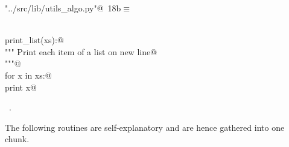 \documentclass[11.5pt]{report}
\begin{document}
\begin{flushleft} \small\label{scrap11}\raggedright\small
{} \verb@"../src/lib/utils_algo.py"@\nobreak\ {\footnotesize {18b}}$\equiv$
\vspace{-1ex}
\begin{list}{}{} \item
\mbox{}\verb@@\\
\mbox{}\verb@def print_list(xs):@\\
\mbox{}\verb@    """ Print each item of a list on new line@\\
\mbox{}\verb@    """@\\
\mbox{}\verb@    for x in xs:@\\
\mbox{}\verb@        print x@\\
\mbox{}\verb@@{\NWsep}
\end{list}
\vspace{-1.5ex}
\footnotesize
\begin{list}{}{\setlength{\itemsep}{-\parsep}\setlength{\itemindent}{-\leftmargin}}
\item \NWtxtFileDefBy\ .

\item{}
\end{list}
\vspace{4ex}
\end{flushleft}
\newchunk The following routines are self-explanatory and are hence gathered into one chunk. 
\end{document}
